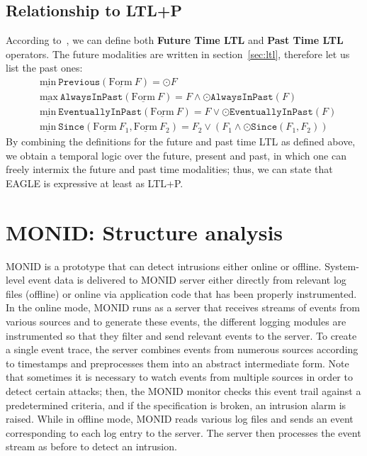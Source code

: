 \documentclass[english]{article}
\begin{document}
\subsection{Relationship to LTL+P}
According to~\cite{barringer2004rule,barringer2003eagle}, we can define both \textbf{Future Time LTL} and \textbf{Past Time LTL} operators. The future modalities are written in section~\ref{sec:ltl}, therefore let us list the past ones:
\begin{align*}
    & \underline{\text{min}}\ \mathtt{Previous}(\underline{\text{Form}}\ F) = \odot F \\
    & \underline{\text{max}}\ \mathtt{AlwaysInPast}(\underline{\text{Form}}\ F) = F \land \odot \mathtt{AlwaysInPast}(F) \\
    & \underline{\text{min}}\ \mathtt{EventuallyInPast}(\underline{\text{Form}}\ F) = F \lor \odot \mathtt{EventuallyInPast}(F) \\
    & \underline{\text{min}}\ \mathtt{Since}(\underline{\text{Form}}\ F_1, \underline{\text{Form}}\ F_2) = F_2 \lor (F_1 \land \odot \mathtt{Since}(F_1,F_2))
\end{align*}
By combining the definitions for the future and past time LTL as defined above, we obtain a temporal logic over the future, present and past, in which one can freely intermix the future and past time modalities; thus, we can state that EAGLE is expressive at least as LTL+P.

\section{MONID: Structure analysis}
MONID is a prototype that can detect intrusions either online or offline. System-level event data is delivered to MONID server either directly from relevant log files (offline) or online via application code that has been properly instrumented. In the online mode, MONID runs as a server that receives streams of events from various sources and to generate these events, the different logging modules are instrumented so that they filter and send relevant events to the server.
To create a single event trace, the server combines events from numerous sources according to timestamps and preprocesses them into an abstract intermediate form. Note that sometimes it is necessary to watch events from multiple sources in order to detect certain attacks; then, the MONID monitor checks this event trail against a predetermined criteria, and if the specification is broken, an intrusion alarm is raised. While in offline mode, MONID reads various log files and sends an event corresponding to each log entry to the server. The server then processes the event stream as before to detect an intrusion.
\end{document}
